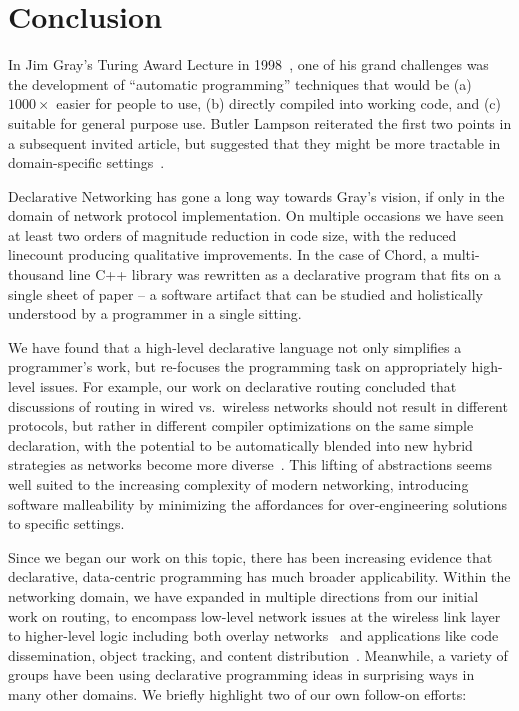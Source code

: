 \section{Conclusion}
In Jim Gray's Turing Award Lecture in 1998~\cite{grayturing}, one of
his grand challenges was the development of ``automatic
programming'' techniques that would be (a) $1000\times$ easier for people to use, (b) directly compiled into working code, and (c) suitable for
general purpose use.  
Butler Lampson reiterated the first two points in a subsequent invited article, but suggested that 
they might be more tractable in domain-specific settings~\cite{lampsonjacm}.  

Declarative Networking has gone a long way towards Gray's vision, if only in the domain of network protocol implementation.  On multiple occasions we have seen at least two orders of magnitude reduction in code size, with the reduced linecount producing qualitative improvements.  In the case of Chord, a multi-thousand line C++ library was rewritten as a declarative program that fits on a single sheet of paper -- a software artifact that can be studied and holistically understood by a programmer in a single sitting.  

We have found that a high-level declarative language not only simplifies a programmer's work, but re-focuses the programming task on appropriately high-level issues. For example, our work on declarative routing concluded that discussions of routing in wired vs.\ wireless networks should not result in different protocols, but rather in different compiler optimizations on the same simple declaration, with the potential to be automatically blended into new hybrid strategies as networks become more diverse~\cite{sigcomm05, ipsn09}.  This lifting of abstractions seems well suited to the increasing complexity of modern networking, introducing software malleability by minimizing the affordances for over-engineering solutions to specific settings.

Since we began our work on this topic, there has been increasing evidence that declarative, data-centric programming has much broader
applicability. Within the networking domain, we have expanded in
multiple directions from our initial work on routing, to encompass
low-level network issues at the wireless link layer~\cite{sensys07} to
higher-level logic including both overlay
networks~\cite{sosp05,sensys07} and applications like code
dissemination, object tracking, and content
distribution~\cite{sensys07,ipsn09}.  Meanwhile, a
variety of groups have been using declarative programming ideas in
surprising ways in many other domains. We briefly highlight two of our own follow-on
efforts:

